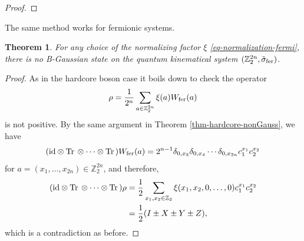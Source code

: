 \documentclass[12pt,reqno]{amsart}
\newtheorem{thm}{Theorem}
\theoremstyle{definition}
\theoremstyle{definition}
\theoremstyle{definition}
\numberwithin{thm}{section}
\numberwithin{equation}{section}
\newcommand{\z}{\mathbb{Z}}
\newcommand{\tr}{{\rm Tr}\,}
\newcommand{\id}{{\rm id}}
\begin{document}
\begin{proof}
\end{proof}


The same method works for fermionic systems.



\begin{thm} \label{thm-fermi-nonGauss}
   For any choice of the normalizing factor $\xi$ \eqref{eq-normalization-fermi}, there is no B-Gaussian state on the quantum kinematical system $(\z_2^{2n}, \tilde{\sigma}_{\rm fer})$.
\end{thm}
\begin{proof}
As in the hardcore boson case it boils down to check the operator
    $$\rho=\frac{1}{2^n}\sum_{ a \in \z_2^{2n}}\xi( a ) W_{\rm fer}( a )$$
is not positive.
By the same argument in Theorem \ref{thm-hardcore-nonGauss}, we have
$$(\id\otimes\tr\otimes\cdots\otimes\tr)W_{\rm fer}(a)=2^{n-1}\delta_{0,x_{3}}\delta_{0,x_4}\cdots\delta_{0,x_{2n}} c^{x_1}_1c^{x_2}_2$$
for $a=(x_1,\ldots, x_{2n})\in \z_2^{2n}$, and therefore,
\begin{align*}
    (\id\otimes\tr\otimes\cdots\otimes\tr)\rho&=\frac{1}{2}\sum_{x_1,x_2\in \z_2}\xi(x_1,x_2,0,\ldots,0)c^{x_1}_1c^{x_2}_2\\
    &=\frac{1}{2}(I\pm X\pm Y\pm Z),
\end{align*}
which is a contradiction as before.
\end{proof}
\end{document}

